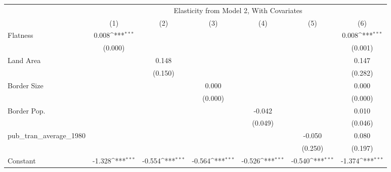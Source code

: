 {
\def\sym#1{\ifmmode^{#1}\else\(^{#1}\)\fi}
\begin{tabular}{l*{6}{c}}
\hline\hline
            &\multicolumn{6}{c}{Elasticity from Model 2, With Covariates}                                                                       \\
            &\multicolumn{1}{c}{(1)}         &\multicolumn{1}{c}{(2)}         &\multicolumn{1}{c}{(3)}         &\multicolumn{1}{c}{(4)}         &\multicolumn{1}{c}{(5)}         &\multicolumn{1}{c}{(6)}         \\
\hline
Flatness    &       0.008\sym{***}&                     &                     &                     &                     &       0.008\sym{***}\\
            &     (0.000)         &                     &                     &                     &                     &     (0.001)         \\
[1em]
Land Area   &                     &       0.148         &                     &                     &                     &       0.147         \\
            &                     &     (0.150)         &                     &                     &                     &     (0.282)         \\
[1em]
Border Size &                     &                     &       0.000         &                     &                     &       0.000         \\
            &                     &                     &     (0.000)         &                     &                     &     (0.000)         \\
[1em]
Border Pop. &                     &                     &                     &      -0.042         &                     &       0.010         \\
            &                     &                     &                     &     (0.049)         &                     &     (0.046)         \\
[1em]
pub\_tran\_average\_1980&                     &                     &                     &                     &      -0.050         &       0.080         \\
            &                     &                     &                     &                     &     (0.250)         &     (0.197)         \\
[1em]
Constant    &      -1.328\sym{***}&      -0.554\sym{***}&      -0.564\sym{***}&      -0.526\sym{***}&      -0.540\sym{***}&      -1.374\sym{***}\\

\end{tabular}}
